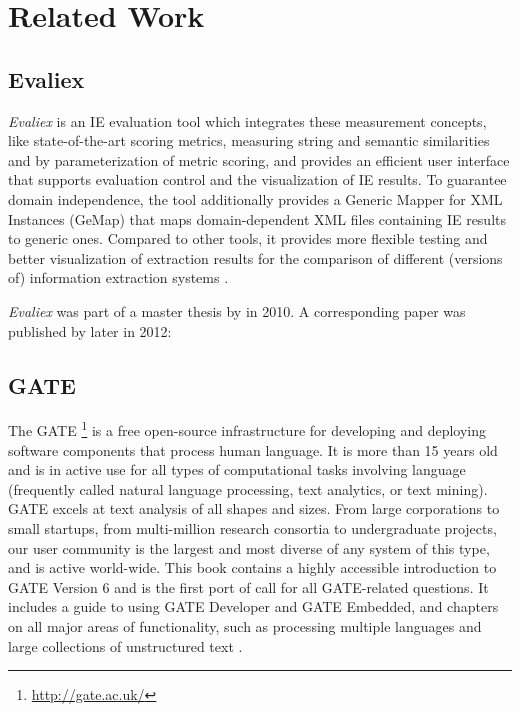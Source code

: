 \section{Related Work}
\label{sec:related-work}

\subsection{Evaliex}
\textit{Evaliex} is an \gls{IE} evaluation tool which integrates these measurement concepts, like state-of-the-art scoring metrics, measuring string and semantic similarities and by parameterization of metric scoring, and provides an efficient user interface that supports evaluation control and the visualization of \gls{IE} results. To guarantee domain independence, the tool additionally provides a Generic Mapper for XML Instances (GeMap) that maps domain-dependent XML files containing \gls{IE} results to generic ones. Compared to other tools, it provides more flexible testing and better visualization of extraction results for the comparison of different (versions of) information extraction systems \cite{Feilmayr:2012}.

\textit{Evaliex}  was part of a master thesis by \citeauthor{Linsmayr:2010} in 2010. A corresponding paper was published by \citeauthor{Feilmayr:2012} later in 2012:

\begin{quote}
\end{quote}

\begin{quote}
\end{quote}

\subsection{GATE}
The \gls{GATE} \footnote{\url{http://gate.ac.uk/}} is a free open-source infrastructure for developing and deploying software components that process human language. It is more than 15 years old and is in active use for all types of computational tasks involving language (frequently called natural language processing, text analytics, or text mining). GATE excels at text analysis of all shapes and sizes. From large corporations to small startups, from multi-million research consortia to undergraduate projects, our user community is the largest and most diverse of any system of this type, and is active world-wide. This book contains a highly accessible introduction to GATE Version 6 and is the first port of call for all GATE-related questions. It includes a guide to using GATE Developer and GATE Embedded, and chapters on all major areas of functionality, such as processing multiple languages and large collections of unstructured text \cite{Cunningham:2011}.

